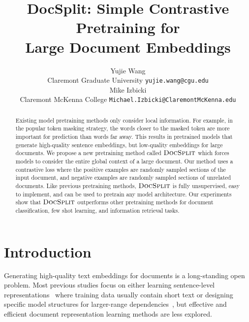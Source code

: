 \documentclass[11pt]{article}
\title{DocSplit: Simple Contrastive Pretraining for \\ Large Document Embeddings}
\author{Yujie Wang \\
  Claremont Graduate University 
  \texttt{yujie.wang@cgu.edu} \\\And
  Mike Izbicki \\
  Claremont McKenna College
  \texttt{Michael.Izbicki@ClaremontMcKenna.edu} \\}
\newcommand{\our}{\mbox{\textsc{DocSplit}}}
\begin{document}
\maketitle
\begin{abstract}

Existing model pretraining methods only consider local information.
For example, in the popular token masking strategy, the words closer to the masked token are more important for prediction than words far away.
This results in pretrained models that generate high-quality sentence embeddings, but low-quality embeddings for large documents.
We propose a new pretraining method called $\our$ which forces models to consider the entire global context of a large document.
Our method uses a contrastive loss where the positive examples are randomly sampled sections of the input document, and negative examples are randomly sampled sections of unrelated documents.
Like previous pretraining methods, $\our$ is fully unsupervised, easy to implement, and can be used to pretrain any model
architecture.
Our experiments show that $\our$ outperforms other pretraining methods for document classification, few shot learning, and information retrieval tasks.
\end{abstract}



\section{Introduction}

Generating high-quality text embeddings for documents is a long-standing open problem.
Most previous studies focus on either learning sentence-level representations~\cite{Hill2016LearningDR, Logeswaran2018AnEF, Gao2021SimCSESC} where training data usually contain short text or designing specific model structures for larger-range dependencies~\cite{Beltagy2020LongformerTL, Zaheer2020BigBT},
but effective and efficient document representation learning methods are less explored.
\end{document}
